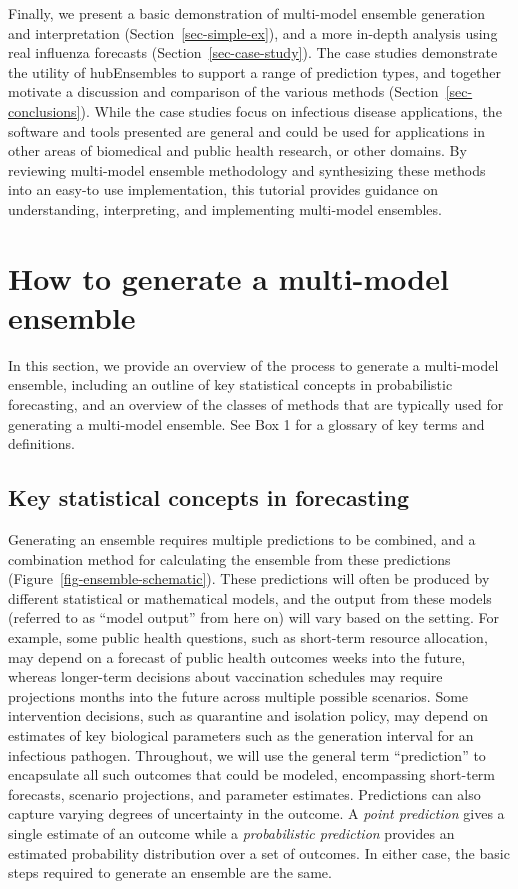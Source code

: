\documentclass[
]{article}
\begin{document}
Finally, we present a basic demonstration of multi-model ensemble
generation and interpretation (Section~\ref{sec-simple-ex}), and a more
in-depth analysis using real influenza forecasts
(Section~\ref{sec-case-study}). The case studies demonstrate the utility
of hubEnsembles to support a range of prediction types, and together
motivate a discussion and comparison of the various methods
(Section~\ref{sec-conclusions}). While the case studies focus on
infectious disease applications, the software and tools presented are
general and could be used for applications in other areas of biomedical
and public health research, or other domains. By reviewing multi-model
ensemble methodology and synthesizing these methods into an easy-to use
implementation, this tutorial provides guidance on understanding,
interpreting, and implementing multi-model ensembles.

\section{How to generate a multi-model ensemble}\label{sec-defs}

In this section, we provide an overview of the process to generate a
multi-model ensemble, including an outline of key statistical concepts
in probabilistic forecasting, and an overview of the classes of methods
that are typically used for generating a multi-model ensemble. See Box 1
for a glossary of key terms and definitions.

\subsection{Key statistical concepts in
forecasting}\label{key-statistical-concepts-in-forecasting}

Generating an ensemble requires multiple predictions to be combined, and
a combination method for calculating the ensemble from these predictions
(Figure~\ref{fig-ensemble-schematic}). These predictions will often be
produced by different statistical or mathematical models, and the output
from these models (referred to as ``model output'' from here on) will
vary based on the setting. For example, some public health questions,
such as short-term resource allocation, may depend on a forecast of
public health outcomes weeks into the future, whereas longer-term
decisions about vaccination schedules may require projections months
into the future across multiple possible scenarios. Some intervention
decisions, such as quarantine and isolation policy, may depend on
estimates of key biological parameters such as the generation interval
for an infectious pathogen. Throughout, we will use the general term
``prediction'' to encapsulate all such outcomes that could be modeled,
encompassing short-term forecasts, scenario projections, and parameter
estimates. Predictions can also capture varying degrees of uncertainty
in the outcome. A \emph{point prediction} gives a single estimate of an
outcome while a \emph{probabilistic prediction} provides an estimated
probability distribution over a set of outcomes. In either case, the
basic steps required to generate an ensemble are the same.
\end{document}
